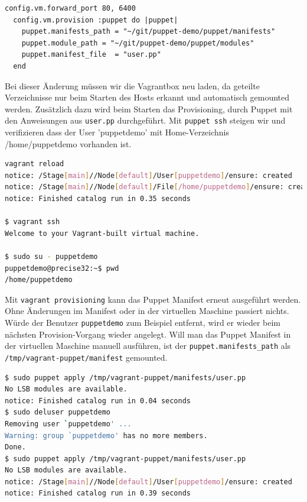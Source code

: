 \documentclass[12pt,a4paper,ngerman]{article}
\begin{document}
\begin{lstlisting}[language=vagrant,caption=Puppet Provisioning in Vagrantfile konfigurieren, label=vagrantprovisioning]
  config.vm.forward_port 80, 6400  
  config.vm.provision :puppet do |puppet|
    puppet.manifests_path = "~/git/puppet-demo/puppet/manifests"
    puppet.module_path = "~/git/puppet-demo/puppet/modules"
    puppet.manifest_file  = "user.pp"
  end
\end{lstlisting} 

Bei dieser Änderung müssen wir die Vagrantbox neu laden, da geteilte Verzeichnisse nur beim Starten des Hosts erkannt und automatisch gemounted werden. Zusätzlich dazu wird beim Starten das Provisioning, durch Puppet mit den Anweisungen aus \lstinline$user.pp$ durchgeführt. Mit \lstinline$puppet ssh$ steigen wir und verifizieren dass der User 'puppetdemo' mit Home-Verzeichnis /home/puppetdemo vorhanden ist.

\begin{lstlisting}[language=sh,caption=Vagrant Box neu laden, label=vagrant-reload]
vagrant reload
notice: /Stage[main]//Node[default]/User[puppetdemo]/ensure: created
notice: /Stage[main]//Node[default]/File[/home/puppetdemo]/ensure: created
notice: Finished catalog run in 0.35 seconds

$ vagrant ssh
Welcome to your Vagrant-built virtual machine.

$ sudo su - puppetdemo
puppetdemo@precise32:~$ pwd
/home/puppetdemo
\end{lstlisting}

Mit \lstinline$vagrant provisioning$ kann das Puppet Manifest erneut ausgeführt werden. Ohne Änderungen im Manifest oder in der virtuellen Maschine passiert nichts. Würde der Benutzer \lstinline$puppetdemo$ zum Beispiel entfernt, wird er wieder beim nächsten Provision-Vorgang wieder angelegt.
Will man das Puppet Manifest in der virtuellen Maschine manuell ausführen, ist der \lstinline$puppet.manifests_path$ als \lstinline$/tmp/vagrant-puppet/manifest$ gemounted.

\begin{lstlisting}[language=sh,caption=Puppet apply im Box, label=vagrant-apply]
$ sudo puppet apply /tmp/vagrant-puppet/manifests/user.pp
No LSB modules are available.
notice: Finished catalog run in 0.04 seconds
$ sudo deluser puppetdemo
Removing user `puppetdemo' ...
Warning: group `puppetdemo' has no more members.
Done.
$ sudo puppet apply /tmp/vagrant-puppet/manifests/user.pp
No LSB modules are available.
notice: /Stage[main]//Node[default]/User[puppetdemo]/ensure: created
notice: Finished catalog run in 0.39 seconds
\end{lstlisting}
\end{document}
